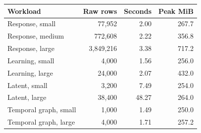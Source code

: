 \begin{tabular}{lrrr}
\toprule
Workload & Raw rows & Seconds & Peak MiB\\
\midrule
Response, small & 77,952 & 2.00 & 267.7\\
Response, medium & 772,608 & 2.22 & 356.8\\
Response, large & 3,849,216 & 3.38 & 717.2\\
Learning, small & 4,000 & 1.56 & 256.0\\
Learning, large & 24,000 & 2.07 & 432.0\\
Latent, small & 3,200 & 7.49 & 254.0\\
Latent, large & 38,400 & 48.27 & 264.0\\
Temporal graph, small & 1,000 & 1.49 & 250.0\\
Temporal graph, large & 4,000 & 1.71 & 257.2\\
\bottomrule
\end{tabular}
